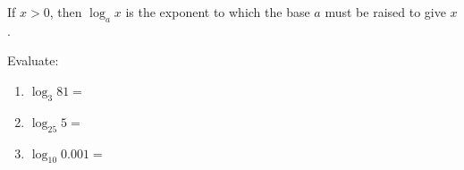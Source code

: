 \begin{frame}
If $x > 0$, then $\log_a x$ is the exponent to which the base $a$ must be raised to give $x$.
\begin{example}
Evaluate:
\begin{enumerate}
\item<1-| alert@2-3> $\log_3 81 =$ 
\item<1-| alert@4-5> $\log_{25} 5 =$ 
\item<1-| alert@6-7> $\log_{10} 0.001 =$ 
\end{enumerate}
\end{example}
\end{frame}
